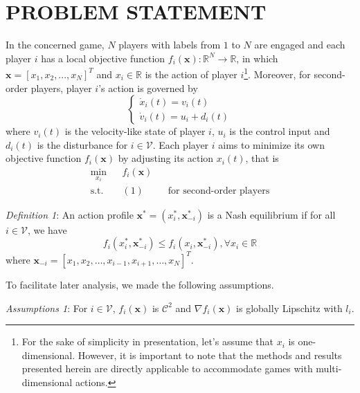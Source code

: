 \documentclass[lettersize,journal]{IEEEtran}
\begin{document}
\section{PROBLEM STATEMENT}
In the concerned game, $N$ players with labels from $1$ to $N$ are engaged and each player $i$ has a local objective function $f_i(\mathbf{x}):\mathbb{R}^N \rightarrow \mathbb{R}$, in which $\mathbf{x} = [x_1,x_2,...,x_N]^T$ and $x_i \in \mathbb{R}$ is the action of player $i$\footnote{
    For the sake of simplicity in presentation, let's assume that $x_i$ is one-dimensional. However, it is important to note that the methods and results presented herein are directly applicable to accommodate games with multi-dimensional actions.
}.
Moreover, for second-order players, player $i$'s action is governed by
\begin{equation}
    \begin{cases}
        \dot{x}_i(t)=v_i(t) \\
        \dot{v}_i(t)=u_i+d_i(t)
    \end{cases}
\end{equation}
where $v_i(t)$ is the velocity-like state of player $i$, $u_i$ is the control input and $d_i(t)$ is the disturbance for $i \in \mathcal{V}$. Each player $i$ aims to minimize its own objective function $f_i(\mathbf{x})$ by adjusting its action $x_i(t)$, that is
\begin{equation}
    \begin{aligned}
        \min_{x_i}  &  & f_i(\mathbf{x})                                      \\
        \text{s.t.} &  & (1)             &  & \text{for second-order players}
    \end{aligned}
\end{equation}

\emph{Definition 1}: An action profile $\mathbf{x}^{*}=(x_{i}^{*},\mathbf{x}_{-i}^{*})$ is a Nash equilibrium if for all $i \in \mathcal{V}$, we have
\begin{equation}
    f_i(x_i^*,\mathbf{x}_{-i}^*)\leq f_i(x_i,\mathbf{x}_{-i}^*),\forall x_i\in\mathbb{R}
\end{equation}
where $\mathbf{x}_{-i}=[x_{1},x_{2},\ldots,x_{i-1},x_{i+1},\ldots,x_{N}]^{T}$.

To facilitate later analysis, we made the following assumptions.

\emph{Assumptions 1}: For $i \in \mathcal{V}$, $f_i(\mathbf{x})$ is $\mathcal{C}^2$ and $\nabla f_i(\mathbf{x})$ is globally Lipschitz with $l_i$.
\end{document}
